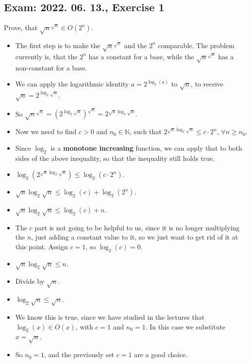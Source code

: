 \subsection{Exam: 2022. 06. 13., Exercise 1}


Prove, that $\sqrt{n}^{\sqrt{n}} \in{} O(2^n)$.


\begin{itemize}
    \item The first step is to make the $\sqrt{n}^{\sqrt{n}}$ and the $2^n$ comparable. The problem currently is, that the $2^n$ has a constant for a base, while the $\sqrt{n}^{\sqrt{n}}$ has a non-constant for a base.
    \item We can apply the logarithmic identity $a = 2^{\log_2(a)}$ to $\sqrt{n}$, to receive $\sqrt{n} = 2^{\log_2{\sqrt{n}}}$.
    \item So $\sqrt{n}^{\sqrt{n}} = (2^{\log_2\sqrt{n}})^{\sqrt{n}} = 2^{\sqrt{n}\log_2{\sqrt{n}}}$.
    \item Now we need to find $c>0$ and $n_0\in{}\mathds{N}$, such that $2^{\sqrt{n}\log_2{\sqrt{n}}} \leq{} c\cdot{}2^n$, $\forall{} n\geq{}n_0$.
    \item Since $\log_2$ is a \textbf{monotone increasing} function, we can apply that to both sides of the above inequality, so that the inequality still holds true.
    \item $\log_2(2^{\sqrt{n}\log_2{\sqrt{n}}}) \leq{} \log_2(c\cdot{}2^n)$.
    \item $\sqrt{n}\log_2{\sqrt{n}} \leq{} \log_2(c) + \log_2(2^n)$.
    \item $\sqrt{n}\log_2{\sqrt{n}} \leq{} \log_2(c) + n$.
    \item The $c$ part is not going to be helpful to us, since it is no longer multiplying the $n$, just adding a constant value to it, so we just want to get rid of it at this point. Assign $c=1$, so $\log_2(c) = 0$.
    \item $\sqrt{n}\log_2{\sqrt{n}} \leq{} n$.
    \item Divide by $\sqrt{n}$.
    \item $\log_2{\sqrt{n}} \leq{} \sqrt{n}$.
    \item We know this is true, since we have studied in the lectures that $\log_2(x) \in{} O(x)$, with $c=1$ and $n_0=1$. In this  case we substitute $x = \sqrt{n}$.
    \item So $n_0=1$, and the previously set $c=1$ are a good choice.
\end{itemize}